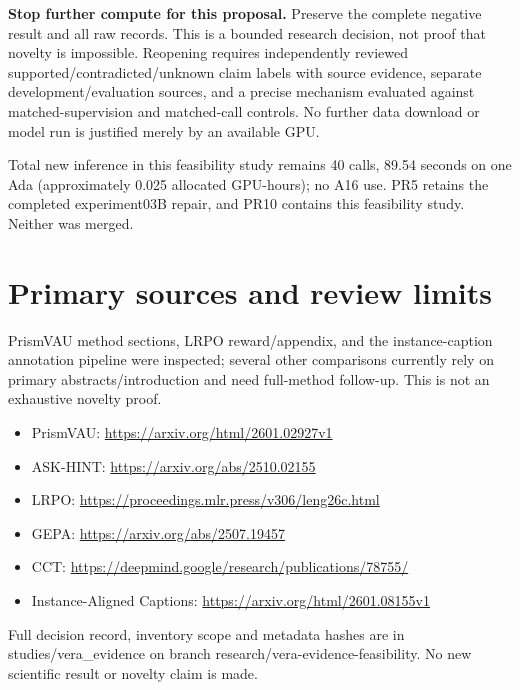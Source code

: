 \documentclass[11pt]{article}
\begin{document}
\textbf{Stop further compute for this proposal.} Preserve the complete negative result and all raw records. This is a bounded research decision, not proof that novelty is impossible. Reopening requires independently reviewed supported/contradicted/unknown claim labels with source evidence, separate development/evaluation sources, and a precise mechanism evaluated against matched-supervision and matched-call controls. No further data download or model run is justified merely by an available GPU.

Total new inference in this feasibility study remains 40 calls, 89.54 seconds on one Ada (approximately 0.025 allocated GPU-hours); no A16 use. PR5 retains the completed experiment03B repair, and PR10 contains this feasibility study. Neither was merged.

\section{Primary sources and review limits}
PrismVAU method sections, LRPO reward/appendix, and the instance-caption annotation pipeline were inspected; several other comparisons currently rely on primary abstracts/introduction and need full-method follow-up. This is not an exhaustive novelty proof.
\begin{itemize}
\item PrismVAU: \url{https://arxiv.org/html/2601.02927v1}
\item ASK-HINT: \url{https://arxiv.org/abs/2510.02155}
\item LRPO: \url{https://proceedings.mlr.press/v306/leng26c.html}
\item GEPA: \url{https://arxiv.org/abs/2507.19457}
\item CCT: \url{https://deepmind.google/research/publications/78755/}
\item Instance-Aligned Captions: \url{https://arxiv.org/html/2601.08155v1}
\end{itemize}
Full decision record, inventory scope and metadata hashes are in studies/vera\_evidence on branch research/vera-evidence-feasibility. No new scientific result or novelty claim is made.
\end{document}
